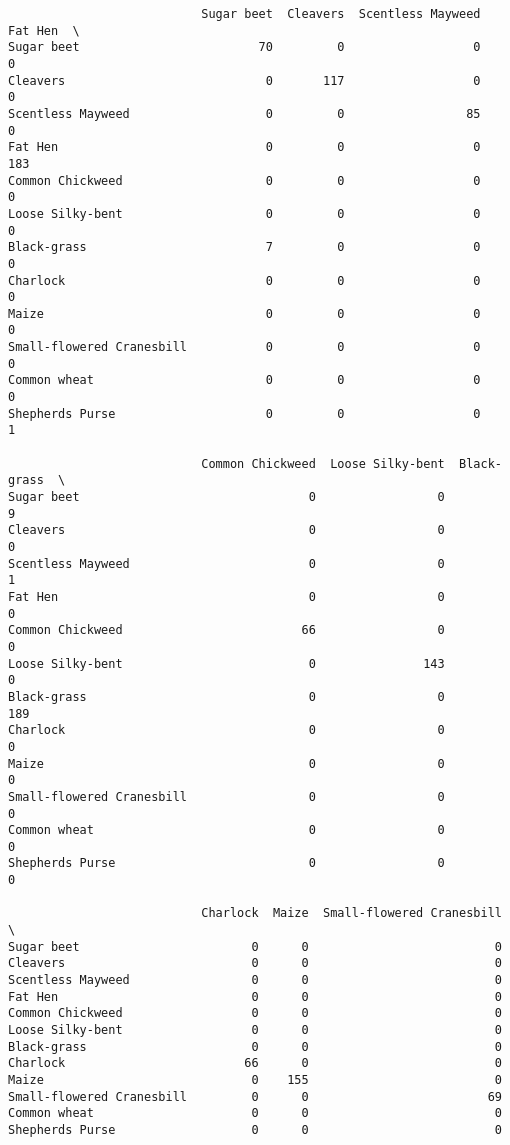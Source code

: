 \documentclass[11pt]{article}
\begin{document}
    
    \begin{verbatim}
                           Sugar beet  Cleavers  Scentless Mayweed  Fat Hen  \
Sugar beet                         70         0                  0        0   
Cleavers                            0       117                  0        0   
Scentless Mayweed                   0         0                 85        0   
Fat Hen                             0         0                  0      183   
Common Chickweed                    0         0                  0        0   
Loose Silky-bent                    0         0                  0        0   
Black-grass                         7         0                  0        0   
Charlock                            0         0                  0        0   
Maize                               0         0                  0        0   
Small-flowered Cranesbill           0         0                  0        0   
Common wheat                        0         0                  0        0   
Shepherds Purse                     0         0                  0        1   

                           Common Chickweed  Loose Silky-bent  Black-grass  \
Sugar beet                                0                 0            9   
Cleavers                                  0                 0            0   
Scentless Mayweed                         0                 0            1   
Fat Hen                                   0                 0            0   
Common Chickweed                         66                 0            0   
Loose Silky-bent                          0               143            0   
Black-grass                               0                 0          189   
Charlock                                  0                 0            0   
Maize                                     0                 0            0   
Small-flowered Cranesbill                 0                 0            0   
Common wheat                              0                 0            0   
Shepherds Purse                           0                 0            0   

                           Charlock  Maize  Small-flowered Cranesbill  \
Sugar beet                        0      0                          0   
Cleavers                          0      0                          0   
Scentless Mayweed                 0      0                          0   
Fat Hen                           0      0                          0   
Common Chickweed                  0      0                          0   
Loose Silky-bent                  0      0                          0   
Black-grass                       0      0                          0   
Charlock                         66      0                          0   
Maize                             0    155                          0   
Small-flowered Cranesbill         0      0                         69   
Common wheat                      0      0                          0   
Shepherds Purse                   0      0                          0   


\end{verbatim}
\end{document}
